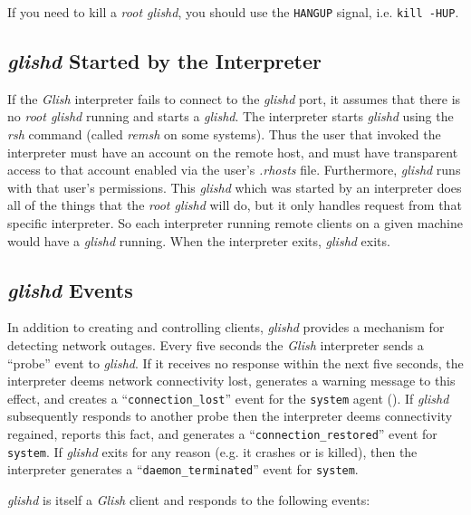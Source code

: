 \begin{sloppy}
If you need to kill a {\em root glishd}, you should use the {\tt HANGUP}
signal, i.e. \verb+kill -HUP+.

\subsection{{\em glishd} Started by the Interpreter }

If the {\em Glish} interpreter fails to connect to the {\em glishd} port, it
assumes that there is no {\em root glishd} running and starts a
{\em glishd}. The interpreter starts {\em glishd} using
the {\em rsh} command
(called {\em remsh} on some systems).  Thus the user that invoked
the interpreter must have an account on the remote host, and must
have transparent access to that account enabled via the user's
{\em .rhosts} file.  Furthermore, {\em glishd} runs with that user's
permissions.  This {\em glishd} which was started by an interpreter
does all of the things that the {\em root glishd} will do, but it
only handles request from that specific interpreter. So each
interpreter running remote clients on a given machine would have a
{\em glishd} running. When the interpreter exits, {\em glishd} exits.

\subsection{{\em glishd} Events }

In addition to creating and controlling clients, {\em glishd} provides
a mechanism for detecting network outages.  Every five seconds the
{\em Glish} interpreter sends a ``probe'' event to {\em glishd\/}.  If it
receives no response within the next five seconds, the interpreter
deems network connectivity lost, generates a warning message to this
effect, and creates a ``{\tt connection\_lost}'' event for the
{\tt system} agent ().  If {\em glishd} subsequently
responds to another probe then the interpreter deems connectivity
regained, reports this fact, and generates a ``{\tt connection\_restored}''
event for {\tt system}.  If {\em glishd} exits for any reason (e.g. 
it crashes or is killed), then the interpreter generates a
``{\tt daemon\_terminated}'' event for {\tt system}.

{\em glishd} is itself a {\em Glish} client and responds to the following events:
\begin{list}{}{}


\end{list}
\end{sloppy}
